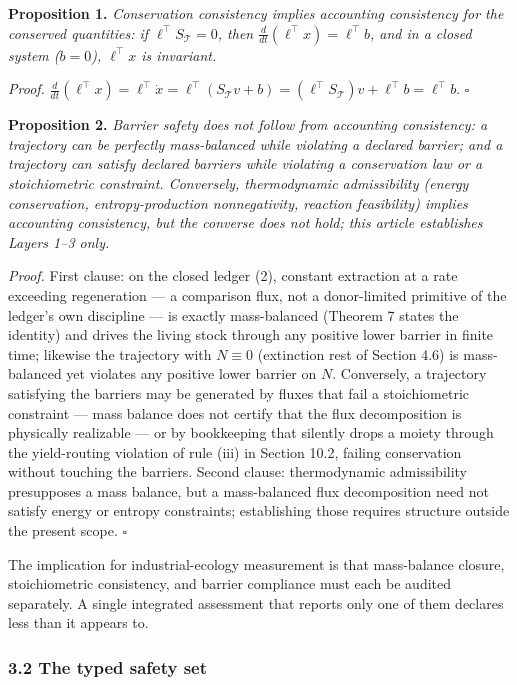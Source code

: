 \documentclass[11pt]{article}
\begin{document}
\textbf{Proposition 1.} \emph{Conservation consistency implies
accounting consistency for the conserved quantities: if
\(\ell^\top S_{\mathcal{T}} = 0\), then
\(\frac{d}{dt}(\ell^\top x) = \ell^\top b\), and in a closed system
(\(b = 0\)), \(\ell^\top x\) is invariant.}

\emph{Proof.}
\(\frac{d}{dt}(\ell^\top x) = \ell^\top \dot x = \ell^\top(S_{\mathcal{T}} v + b) = (\ell^\top S_{\mathcal{T}}) v + \ell^\top b = \ell^\top b\).
\ensuremath{\square}

\textbf{Proposition 2.} \emph{Barrier safety does not follow from
accounting consistency: a trajectory can be perfectly mass-balanced
while violating a declared barrier; and a trajectory can satisfy
declared barriers while violating a conservation law or a stoichiometric
constraint. Conversely, thermodynamic admissibility (energy
conservation, entropy-production nonnegativity, reaction feasibility)
implies accounting consistency, but the converse does not hold; this
article establishes Layers 1--3 only.}

\emph{Proof.} First clause: on the closed ledger (2), constant
extraction at a rate exceeding regeneration --- a comparison flux, not a
donor-limited primitive of the ledger's own discipline --- is exactly
mass-balanced (Theorem 7 states the identity) and drives the living
stock through any positive lower barrier in finite time; likewise the
trajectory with \(N \equiv 0\) (extinction rest of Section 4.6) is
mass-balanced yet violates any positive lower barrier on \(N\).
Conversely, a trajectory satisfying the barriers may be generated by
fluxes that fail a stoichiometric constraint --- mass balance does not
certify that the flux decomposition is physically realizable --- or by
bookkeeping that silently drops a moiety through the yield-routing
violation of rule (iii) in Section 10.2, failing conservation without
touching the barriers. Second clause: thermodynamic admissibility
presupposes a mass balance, but a mass-balanced flux decomposition need
not satisfy energy or entropy constraints; establishing those requires
structure outside the present scope. \ensuremath{\square}

The implication for industrial-ecology measurement is that mass-balance
closure, stoichiometric consistency, and barrier compliance must each be
audited separately. A single integrated assessment that reports only one
of them declares less than it appears to.

\subsubsection{3.2 The typed safety set}\label{the-typed-safety-set}
\end{document}
